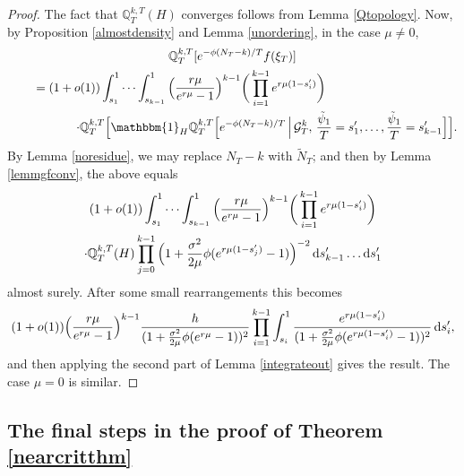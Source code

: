 \documentclass{article}
\theoremstyle{plain}
\theoremstyle{definition}
\newcommand{\Q}{\mathbb{Q}}
\newcommand{\G}{\mathcal{G}}
\newcommand{\ind}{\mathbbm{1}}
\renewcommand{\d}{{\rm{d}}}
\begin{document}
\begin{proof}
The fact that $\Q^{k,T}_T(H)$ converges follows from Lemma \ref{Qtopology}. Now, by Proposition \ref{almostdensity} and Lemma \ref{unordering}, in the case $\mu\neq 0$,
\begin{multline*}
\Q^{k,T}_T[e^{-\phi(N_T-k)/T}f(\xi_T)]\\
\hspace{-30mm}= (1+o(1))\int_{s_1}^1\cdots \int_{s_{k-1}}^1 \Big(\frac{r\mu}{e^{r\mu}-1}\Big)^{k-1} \bigg(\prod_{i=1}^{k-1} e^{r\mu(1-s_i')}\bigg)\\
\hspace{20mm}\cdot\Q^{k,T}_T\Big[\ind_H \Q^{k,T}_T\Big[e^{-\phi(N_T-k)/T}\,\Big|\,\G^k_T,\, \frac{\tilde\psi_1}{T}=s_1',\ldots,\frac{\tilde\psi_1}{T}=s_{k-1}'\Big]\Big].
\end{multline*}
By Lemma \ref{noresidue}, we may replace $N_T-k$ with $\tilde N_T$; and then by Lemma \ref{lemmgfconv}, the above equals
\begin{multline*}
(1+o(1)) \int_{s_1}^1\cdots \int_{s_{k-1}}^1 \Big(\frac{r\mu}{e^{r\mu}-1}\Big)^{k-1}\bigg(\prod_{i=1}^{k-1} e^{r\mu(1-s_i')}\bigg)\\
\cdot \Q^{k,T}_T(H)\prod_{j=0}^{k-1}\Big(1+\frac{\sigma^2}{2\mu}\phi(e^{r\mu(1-s_j')}-1)\Big)^{-2}\,\d s_{k-1}'\ldots\d s_1'
\end{multline*}
almost surely. After some small rearrangements this becomes
\[(1+o(1)) \Big(\frac{r\mu}{e^{r\mu}-1}\Big)^{k-1} \frac{h}{(1+\frac{\sigma^2}{2\mu}\phi(e^{r\mu}-1))^2}\prod_{i=1}^{k-1} \int_{s_i}^1 \frac{e^{r\mu(1-s_i')}}{(1+\frac{\sigma^2}{2\mu}\phi(e^{r\mu(1-s_i')}-1))^2}\,\d s_i',\]
and then applying the second part of Lemma \ref{integrateout} gives the result. The case $\mu=0$ is similar.
\end{proof}


\subsection{The final steps in the proof of Theorem \ref{nearcritthm}}
\end{document}
